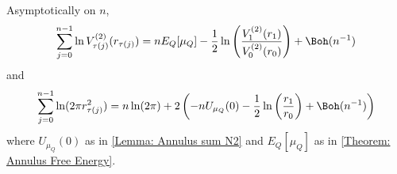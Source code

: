 \begin{lema}	\label{Lemma: Annulus Sum 1/2}
		Asymptotically on $n$,
		\begin{equation}
		\sum_{j=0}^{n-1}  \ln V^{(2)}_{\tau(j)}(r_{\tau(j)})  = n E_Q[\mu_Q] -   \frac{1}{2} \ln \left( \frac{V^{(2)}_{1}(r_1)}{V^{(2)}_{0}(r_{0})} \right) + \Boh(n^{-1})
		\label{Equation: logV annulus}
	\end{equation}
	and
	\begin{equation}
		\sum_{j=0}^{n-1}  \ln(2\pi r^2_{\tau(j)}) = n \ln(2\pi) + 2 \left( - n U_{\mu_Q}(0) - \frac{1}{2} \ln\left(\frac{r_1}{r_0}\right) + \Boh(n^{-1}) \right) 
		\label{Equation: log(r) annulus}
	\end{equation}
	where $U_{\mu_Q}(0)$ as in \autoref{Lemma: Annulus sum N2} and $	E_Q[\mu_Q]$ as in \autoref{Theorem: Annulus Free Energy}.
\end{lema}

